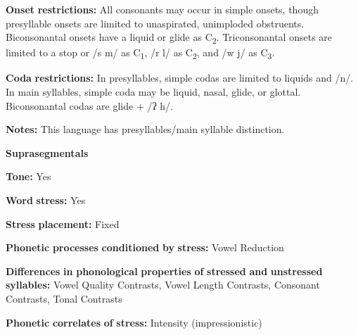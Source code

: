 \begin{styleBody}
\textbf{Onset} \textbf{restrictions:} All consonants may occur in simple onsets, though presyllable onsets are limited to unaspirated, unimploded obstruents. Biconsonantal onsets have a liquid or glide as C\textsubscript{2}. Triconsonantal onsets are limited to a stop or /s m/ as C\textsubscript{1}, /r l/ as C\textsubscript{2}, and /w j/ as C\textsubscript{3}.
\end{styleBody}

\begin{styleBody}
\textbf{Coda} \textbf{restrictions:} In presyllables, simple codas are limited to liquids and /n/. In main syllables, simple coda may be liquid, nasal, glide, or glottal. Biconsonantal codas are glide + /ʔ h/.
\end{styleBody}

\begin{styleBody}
\textbf{Notes:} This language has presyllables/main syllable distinction.
\end{styleBody}

\begin{styleBody}
\textbf{Suprasegmentals}
\end{styleBody}

\begin{styleBody}
\textbf{Tone:} Yes
\end{styleBody}

\begin{styleBody}
\textbf{Word} \textbf{stress:} Yes
\end{styleBody}

\begin{styleBody}
\textbf{Stress} \textbf{placement:} Fixed
\end{styleBody}

\begin{styleBody}
\textbf{Phonetic} \textbf{processes} \textbf{conditioned} \textbf{by} \textbf{stress:} Vowel Reduction
\end{styleBody}

\begin{styleBody}
\textbf{Differences} \textbf{in} \textbf{phonological} \textbf{properties} \textbf{of} \textbf{stressed} \textbf{and} \textbf{unstressed} \textbf{syllables:} Vowel Quality Contrasts, Vowel Length Contrasts, Consonant Contrasts, Tonal Contrasts
\end{styleBody}

\begin{styleBody}
\textbf{Phonetic} \textbf{correlates} \textbf{of} \textbf{stress:} Intensity (impressionistic)
\end{styleBody}

